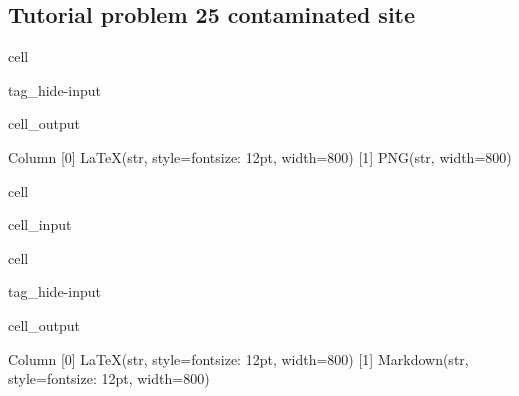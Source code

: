 \documentclass[letterpaper,10pt,english]{jupyterBook}
\begin{document}
\subsection{Tutorial problem 25 \sphinxhyphen{} contaminated site}
\label{\detokenize{content/tutorials/T9/tutorial_09:tutorial-problem-25-contaminated-site}}
\begin{sphinxuseclass}{cell}
\begin{sphinxuseclass}{tag_hide-input}\begin{sphinxVerbatimOutput}

\begin{sphinxuseclass}{cell_output}
\begin{sphinxVerbatim}[commandchars=\\\{\}]
Column
    [0] LaTeX(str, style=\PYGZob{}\PYGZsq{}font\PYGZhy{}size\PYGZsq{}: \PYGZsq{}12pt\PYGZsq{}\PYGZcb{}, width=800)
    [1] PNG(str, width=800)
\end{sphinxVerbatim}

\end{sphinxuseclass}\end{sphinxVerbatimOutput}

\end{sphinxuseclass}
\end{sphinxuseclass}
\begin{sphinxuseclass}{cell}\begin{sphinxVerbatimInput}

\begin{sphinxuseclass}{cell_input}
\begin{sphinxVerbatim}[commandchars=\\\{\}]
\end{sphinxVerbatim}

\end{sphinxuseclass}\end{sphinxVerbatimInput}

\end{sphinxuseclass}
\begin{sphinxuseclass}{cell}
\begin{sphinxuseclass}{tag_hide-input}\begin{sphinxVerbatimOutput}

\begin{sphinxuseclass}{cell_output}
\begin{sphinxVerbatim}[commandchars=\\\{\}]
Column
    [0] LaTeX(str, style=\PYGZob{}\PYGZsq{}font\PYGZhy{}size\PYGZsq{}: \PYGZsq{}12pt\PYGZsq{}\PYGZcb{}, width=800)
    [1] Markdown(str, style=\PYGZob{}\PYGZsq{}font\PYGZhy{}size\PYGZsq{}: \PYGZsq{}12pt\PYGZsq{}\PYGZcb{}, width=800)
\end{sphinxVerbatim}

\end{sphinxuseclass}\end{sphinxVerbatimOutput}

\end{sphinxuseclass}
\end{sphinxuseclass}
\end{document}
